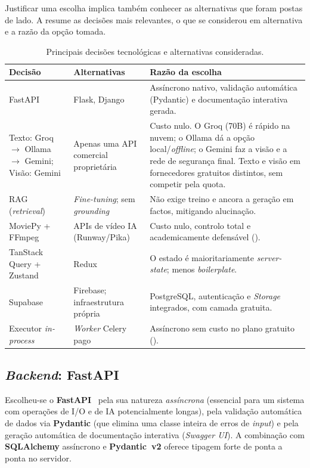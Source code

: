 Justificar uma escolha implica também conhecer as alternativas que foram
postas de lado. A  resume as decisões mais relevantes,
o que se considerou em alternativa e a razão da opção tomada.

\begin{table}[H]
\centering
\caption{Principais decisões tecnológicas e alternativas consideradas.}
\label{tab:decisoes}
\small
\begin{tabularx}{\linewidth}{@{}p{2.9cm}p{3.1cm}Y@{}}
\toprule
\textbf{Decisão} & \textbf{Alternativas} & \textbf{Razão da escolha} \\
\midrule
FastAPI & Flask, Django & Assíncrono nativo, validação automática
(Pydantic) e documentação interativa gerada. \\
Texto: Groq $\rightarrow$ Ollama $\rightarrow$ Gemini; Visão: Gemini & Apenas uma API
comercial proprietária & Custo nulo. O Groq (70B) é rápido na nuvem; o Ollama
dá a opção local/\emph{offline}; o Gemini faz a visão e a rede de segurança final.
Texto e visão em fornecedores gratuitos distintos, sem competir pela quota. \\
RAG (\emph{retrieval}) & \emph{Fine-tuning}; sem \emph{grounding} & Não
exige treino e ancora a geração em factos, mitigando alucinação. \\
MoviePy + FFmpeg & APIs de vídeo IA (Runway/Pika) & Custo nulo, controlo
total e academicamente defensável (). \\
TanStack Query + Zustand & Redux & O estado é maioritariamente
\emph{server-state}; menos \emph{boilerplate}. \\
Supabase & Firebase; infraestrutura própria & PostgreSQL, autenticação e
\emph{Storage} integrados, com camada gratuita. \\
Executor \emph{in-process} & \emph{Worker} Celery pago &
Assíncrono sem custo no plano gratuito (). \\
\bottomrule
\end{tabularx}
\end{table}

\subsection{\emph{Backend}: FastAPI}

Escolheu-se o \textbf{FastAPI}~\cite{fastapi} pela sua natureza \emph{assíncrona}
(essencial para um sistema com operações de I/O e de IA potencialmente
longas), pela validação automática de dados via \textbf{Pydantic} (que
elimina uma classe inteira de erros de \emph{input}) e pela geração
automática de documentação interativa (\emph{Swagger UI}). A combinação
com \textbf{SQLAlchemy} assíncrono e \textbf{Pydantic~v2} oferece tipagem
forte de ponta a ponta no servidor.


